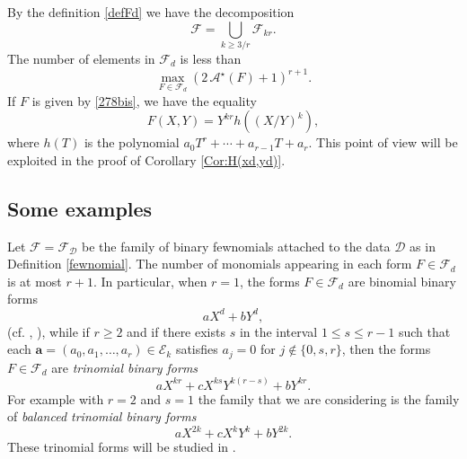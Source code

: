 \documentclass[10pt]{article}
\theoremstyle{definition}
\numberwithin{equation}{section}
\newcommand{\calA}{\mathcal {A}}
\newcommand{\calE}{\mathcal {E}}
\newcommand{\calF}{\mathcal {F}}
\begin{document}
By the definition \eqref{defFd} we have the 
 decomposition
 \[
\mathcal F = \bigcup_{k\geqslant 3/r} \mathcal F_{kr}.
\]
The number of elements in $\mathcal F_d$
is less than
 \begin{equation}\label{Equation:New1}
 \max_{F\in \mathcal F_d}
\left(2\, \calA ^\star(F)+1\right)^{r+1}.
\end{equation}
If $F$ is given by \eqref{278bis},
we have the equality
 \[
F(X,Y) =Y^{kr}h\left( \left(X/Y
\right)^k\right),
\]
where $h(T)$ is the polynomial $a_0 T^r +\cdots + a_{r-1} T + a_r$. This point of view will be exploited in the proof of Corollary \ref{Cor:H(xd,yd)}.

\subsection{Some examples}

Let $\mathcal F = \mathcal F_{\boldsymbol {\mathcal D}}$ be the family of binary fewnomials attached to the data $\boldsymbol {\mathcal D}$ as in Definition \ref{fewnomial}.
The number of monomials appearing in each form $F\in\calF_d$ is at most $ r+1$. In particular, when $r=1$, the forms $F\in\calF_d$ are binomial binary forms 
\begin{equation}\label{Equation:binomialForms}
aX^d+bY^d,
\end{equation}
(cf. \cite[Corollary 1.3]{SX}, \cite{FW2}), while if $r\geqslant 2$ and if there exists $s$ in the interval $1\leqslant s\leqslant r-1$ such that each ${\boldsymbol a} = (a_0,a_1,\dots,a_r)\in\calE_k$ satisfies $a_j=0$ for $j\not\in\{0,s,r\}$, then the forms $F\in\calF_d$ are {\em trinomial binary forms }
\[
aX^{kr}+cX^{ks}Y^{k(r-s)} +bY^{kr}.
\] 
For example with $r=2$ and $s=1$ the family that we are considering is the family of 
{\it balanced trinomial binary forms } 
\begin{equation}\label{balancedtrinomial}
aX^{2k}+cX^kY^k+bY^{2k}.
\end{equation}
These trinomial forms will be studied in \cite{FW6+}.
 
\end{document}

